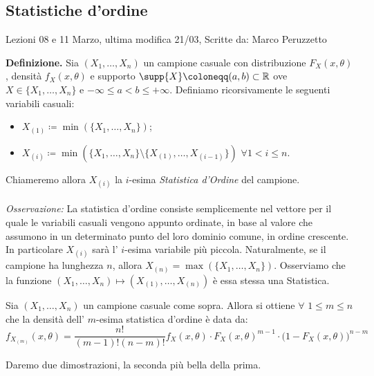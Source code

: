 \subsection{Statistiche d'ordine}
Lezioni 08 e 11 Marzo, ultima modifica 21/03, Scritte da: Marco Peruzzetto

\textbf{Definizione.} Sia $\left(X_1,\ldots ,X_n\right)$ un campione casuale con distribuzione $F_X\left(x,\theta\right)$, densità $f_X\left(x,\theta\right)$ e supporto $\supp\{X\}\coloneqq (a,b)\subset\mathbb{R}$ ove $X\in \{X_1,\ldots,X_n\}$ e $-\infty\leq a<b\leq +\infty$. Definiamo ricorsivamente le seguenti variabili casuali:
\begin{itemize}
\item $X_{(1)}\coloneqq \min\left(\{X_1,\ldots,X_n\}\right)$;
\item $X_{(i)}\coloneqq \min\left(\{X_1,\ldots,X_n\}\setminus\{X_{(1)},\ldots,X_{(i-1)}\}\right)$ $\forall 1<i\leq n$. 
\end{itemize}
Chiameremo allora $X_{(i)}$ la $i$-esima \textit{Statistica d'Ordine} del campione.\\ 
\\
\textit{Osservazione:} La statistica d'ordine consiste semplicemente nel vettore per il quale le variabili casuali vengono appunto ordinate, in base al valore che assumono in un determinato punto del loro dominio comune, in ordine crescente. In particolare $X_{(i)}$ sarà l' $i$-esima variabile più piccola. Naturalmente, se il campione ha lunghezza $n$, allora $X_{(n)}=\max\left(\{X_1,\ldots,X_n\}\right)$. 
Osserviamo che la funzione $\left(X_1,\ldots,X_n\right)\longmapsto \left(X_{(1)},\ldots,X_{(n)}\right)$ è essa stessa una Statistica.
\begin{theorem}
Sia $\left(X_1,\ldots,X_n\right)$ un campione casuale come sopra. Allora si ottiene $\forall$ $1\leq m\leq n$ che la densità dell' $m$-esima statistica d'ordine è data da: 
\begin{displaymath}
f_{X_{(m)}}\left(x,\theta\right)=\frac{n!}{(m-1)!(n-m)!}f_X\left(x,\theta\right)\cdot F_X\left(x,\theta\right)^{m-1}\cdot \big(1-F_X\left(x,\theta\right)\big)^{n-m}
\end{displaymath}
\end{theorem}
Daremo due dimostrazioni, la seconda più bella della prima.
